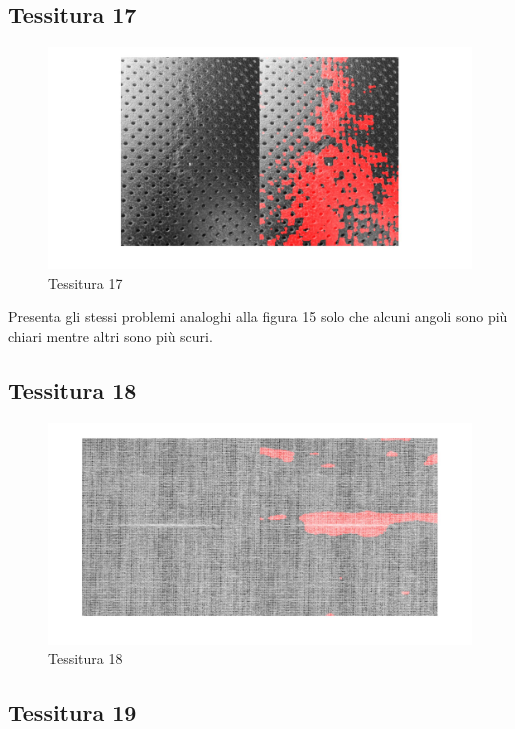\documentclass{article}
\begin{document}
\subsection{Tessitura 17}

\begin{figure}[h!]
	\centering
	\includegraphics[width=\textwidth]{results/res17.jpg}
	\caption{Tessitura 17}
\end{figure}

Presenta gli stessi problemi analoghi alla figura 15 solo che alcuni angoli sono più chiari mentre altri sono più scuri.

\subsection{Tessitura 18}

\begin{figure}[h!]
	\centering
	\includegraphics[width=\textwidth]{results/res18.jpg}
	\caption{Tessitura 18}
\end{figure}

\subsection{Tessitura 19}
\end{document}
